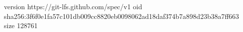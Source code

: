 version https://git-lfs.github.com/spec/v1
oid sha256:3f6f0e1fa57c101db009cc8820eb0098062ad18daf374b7a898d23b38a7ff663
size 128761
